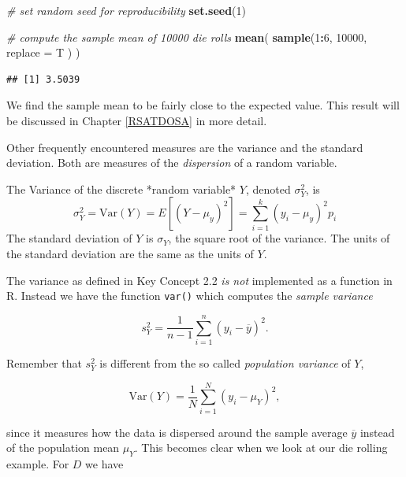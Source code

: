 \documentclass[]{book}
\newenvironment{Shaded}{\begin{snugshade}}{\end{snugshade}}
\newcommand{\KeywordTok}[1]{\textcolor[rgb]{0.13,0.29,0.53}{\textbf{#1}}}
\newcommand{\DataTypeTok}[1]{\textcolor[rgb]{0.13,0.29,0.53}{#1}}
\newcommand{\DecValTok}[1]{\textcolor[rgb]{0.00,0.00,0.81}{#1}}
\newcommand{\CommentTok}[1]{\textcolor[rgb]{0.56,0.35,0.01}{\textit{#1}}}
\newcommand{\OperatorTok}[1]{\textcolor[rgb]{0.81,0.36,0.00}{\textbf{#1}}}
\newcommand{\NormalTok}[1]{#1}
\theoremstyle{definition}
\theoremstyle{definition}
\theoremstyle{definition}
\theoremstyle{remark}
\begin{document}
\begin{Shaded}
\begin{Highlighting}[]
\CommentTok{# set random seed for reproducibility}
\KeywordTok{set.seed}\NormalTok{(}\DecValTok{1}\NormalTok{)}

\CommentTok{# compute the sample mean of 10000 die rolls}
\KeywordTok{mean}\NormalTok{(}
    \KeywordTok{sample}\NormalTok{(}\DecValTok{1}\OperatorTok{:}\DecValTok{6}\NormalTok{, }
           \DecValTok{10000}\NormalTok{, }
           \DataTypeTok{replace =}\NormalTok{ T}
\NormalTok{           )}
\NormalTok{    )}
\end{Highlighting}
\end{Shaded}

\begin{verbatim}
## [1] 3.5039
\end{verbatim}

We find the sample mean to be fairly close to the expected value. This
result will be discussed in Chapter \ref{RSATDOSA} in more detail.

Other frequently encountered measures are the variance and the standard
deviation. Both are measures of the \emph{dispersion} of a random
variable.

\begin{keyconcepts}{2.2}
The Variance of the discrete *random variable* $Y$, denoted $\sigma^2_Y$, is
$$ \sigma^2_Y = \text{Var}(Y) = E\left[(Y-\mu_y)^2\right] = \sum_{i=1}^k (y_i - \mu_y)^2 p_i $$
The standard deviation of $Y$ is $\sigma_Y$, the square root of the variance. The units of the standard deviation are the same as the units of $Y$.
\end{keyconcepts}

The variance as defined in Key Concept 2.2 \emph{is not} implemented as
a function in R. Instead we have the function \texttt{var()} which
computes the \emph{sample variance}

\[ s^2_Y = \frac{1}{n-1} \sum_{i=1}^n (y_i - \overline{y})^2. \]

Remember that \(s^2_Y\) is different from the so called \emph{population
variance} of \(Y\),

\[ \text{Var}(Y) = \frac{1}{N} \sum_{i=1}^N (y_i - \mu_Y)^2, \]

since it measures how the data is dispersed around the sample average
\(\overline{y}\) instead of the population mean \(\mu_Y\). This becomes
clear when we look at our die rolling example. For \(D\) we have
\end{document}
